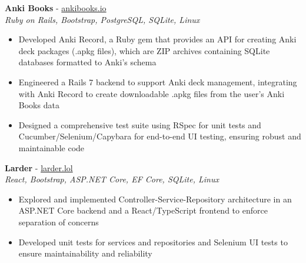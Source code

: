 \documentclass[a4paper,10pt]{article}
\begin{document}
\begin{flushleft}
\textbf{Anki Books} - \href{https://ankibooks.io}{ankibooks.io}\\
\textit{Ruby on Rails, Bootstrap, PostgreSQL, SQLite, Linux}\\
\begin{itemize}
    \item Developed Anki Record, a Ruby gem that provides an API for creating Anki deck packages (.apkg files), which are ZIP archives containing SQLite databases formatted to Anki’s schema
    \item Engineered a Rails 7 backend to support Anki deck management, integrating with Anki Record to create downloadable .apkg files from the user's Anki Books data
    \item Designed a comprehensive test suite using RSpec for unit tests and Cucumber/Selenium/Capybara for end-to-end UI testing, ensuring robust and maintainable code
 
 \end{itemize}

 \textbf{Larder} - \href{https://larder.lol}{larder.lol}\\
\textit{React, Bootstrap, ASP.NET Core, EF Core, SQLite, Linux}\\
\begin{itemize}
    \item Explored and implemented Controller-Service-Repository architecture in an ASP.NET Core backend and a React/TypeScript frontend to enforce separation of concerns
    \item Developed unit tests for services and repositories and Selenium UI tests to ensure maintainability and reliability
 
 \end{itemize}


\end{flushleft}
\end{document}
